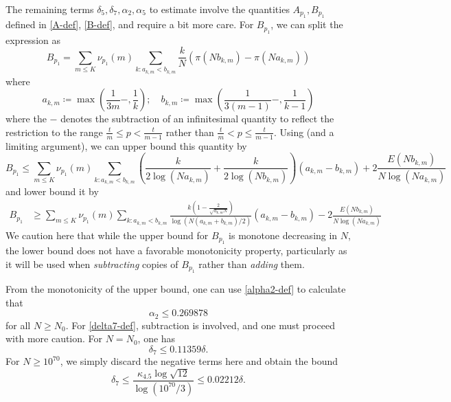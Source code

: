 \documentclass[10pt,a4paper,reqno]{amsart}
\numberwithin{equation}{section}
\theoremstyle{plain}
\theoremstyle{definition}
\begin{document}
The remaining terms $\delta_5, \delta_7, \alpha_2, \alpha_5$ to estimate involve the quantities $A_{p_1}, B_{p_1}$ defined in \eqref{A-def}, \eqref{B-def}, and require a bit more care.  For $B_{p_1}$, we can split the expression as
$$ B_{p_1} = \sum_{m \leq K} \nu_{p_1}(m) \sum_{k: a_{k,m} < b_{k,m}} \frac{k}{N} (\pi( N b_{k,m} ) - \pi(N a_{k,m}))$$
where 
$$ a_{k,m} \coloneqq \max\left( \frac{1}{3m}-, \frac{1}{k} \right); \quad b_{k,m} \coloneqq \max\left( \frac{1}{3(m-1)}-, \frac{1}{k-1} \right)$$
where the $-$ denotes the subtraction of an infinitesimal quantity to reflect the restriction to the range $\frac{t}{m} \leq p < \frac{t}{m-1}$ rather than
$\frac{t}{m} < p \leq \frac{t}{m-1}$.  Using  (and a limiting argument), we can upper bound this quantity by
$$ B_{p_1} \leq \sum_{m \leq K} \nu_{p_1}(m) \sum_{k: a_{k,m} < b_{k,m}} \left(\frac{k}{2\log(N a_{k,m})}+\frac{k}{2\log(N b_{k,m})}\right) (a_{k,m}-b_{k,m}) + 2\frac{E(N b_{k,m})}{N \log(N a_{k,m})} $$
and lower bound it by
\begin{align*}
   B_{p_1} &\geq \sum_{m \leq K} \nu_{p_1}(m) \sum_{k: a_{k,m} < b_{k,m}} \frac{k\left(1-\frac{2}{\sqrt{a_{k,m} N}}\right)}{\log(N (a_{k,m}+b_{k,m})/2)}  (a_{k,m}-b_{k,m}) - 2\frac{E(N b_{k,m})}{N \log(N a_{k,m})}
\end{align*}
We caution here that while the upper bound for $B_{p_1}$ is monotone decreasing in $N$, the lower bound does not have a favorable monotonicity property, particularly as it will be used when \emph{subtracting} copies of $B_{p_1}$ rather than \emph{adding} them.

From the monotonicity of the upper bound, one can use \eqref{alpha2-def} to calculate that 
$$ \alpha_2 \leq 0.269878$$
for all $N \geq N_0$.  For \eqref{delta7-def}, subtraction is involved, and one must proceed with more caution.  For $N=N_0$, one has
$$ \delta_7 \leq 0.11359 \delta.$$
For $N \geq 10^{70}$, we simply discard the negative terms here and obtain the bound
$$ \delta_7 \leq \frac{\kappa_{4.5} \log \sqrt{12}}{\log(10^{70}/3)}  \leq 0.02212 \delta.$$
\end{document}
